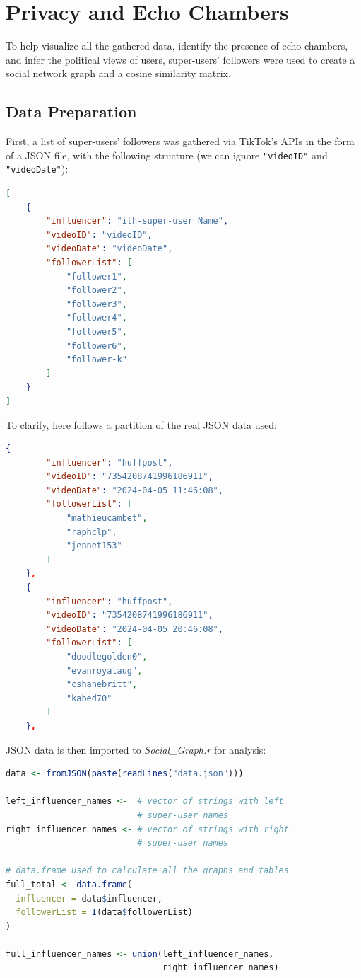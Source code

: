 \section{Privacy and Echo Chambers}

To help visualize all the gathered data, identify the presence of echo chambers, and infer the political views of users, super-users' followers were used to create a social network graph and a cosine similarity matrix.

\subsection{Data Preparation}

First, a list of super-users' followers was gathered via TikTok's APIs in the form of a JSON file, with the following structure (we can ignore \verb+"videoID"+ and \verb+"videoDate"+):

\begin{lstlisting}[language=json]
[
    {
        "influencer": "ith-super-user Name",
        "videoID": "videoID",
        "videoDate": "videoDate",
        "followerList": [
            "follower1",
            "follower2",
            "follower3",
            "follower4",
            "follower5",
            "follower6",
            "follower-k"
        ]
    }
]
\end{lstlisting}

To clarify, here follows a partition of the real JSON data used:

\begin{lstlisting}[language=json]
    {
        "influencer": "huffpost",
        "videoID": "7354208741996186911",
        "videoDate": "2024-04-05 11:46:08",
        "followerList": [
            "mathieucambet",
            "raphclp",
            "jennet153"
        ]
    },
    {
        "influencer": "huffpost",
        "videoID": "7354208741996186911",
        "videoDate": "2024-04-05 20:46:08",
        "followerList": [
            "doodlegolden0",
            "evanroyalaug",
            "cshanebritt",
            "kabed70"
        ]
    },
\end{lstlisting}

JSON data is then imported to \textit{Social\_Graph.r} for analysis:

\begin{lstlisting}[language=R]
data <- fromJSON(paste(readLines("data.json")))

left_influencer_names <-  # vector of strings with left 
                          # super-user names
right_influencer_names <- # vector of strings with right 
                          # super-user names

# data.frame used to calculate all the graphs and tables
full_total <- data.frame(
  influencer = data$influencer,
  followerList = I(data$followerList)
)

full_influencer_names <- union(left_influencer_names, 
                               right_influencer_names)
\end{lstlisting}

